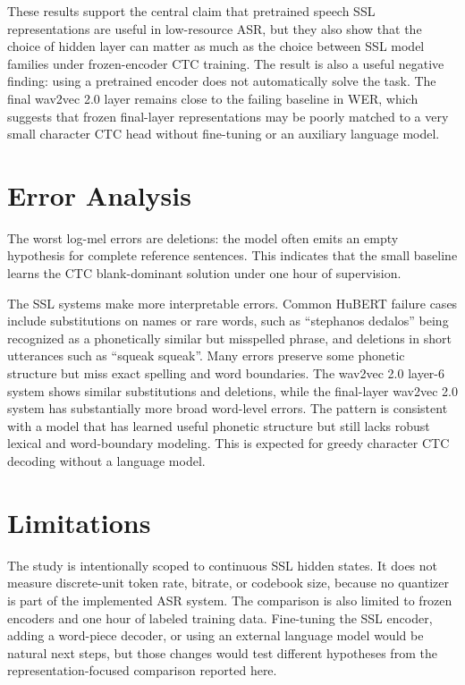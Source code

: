 \documentclass{article}
\begin{document}
These results support the central claim that pretrained speech SSL
representations are useful in low-resource ASR, but they also show that the
choice of hidden layer can matter as much as the choice between SSL model
families under frozen-encoder CTC training. The result is also a useful
negative finding: using a pretrained encoder does not automatically solve the
task. The final wav2vec 2.0 layer remains close to the failing baseline in WER,
which suggests that frozen final-layer representations may be poorly matched
to a very small character CTC head without fine-tuning or an auxiliary language
model.

\section{Error Analysis}

The worst log-mel errors are deletions: the model often emits an empty
hypothesis for complete reference sentences. This indicates that the small
baseline learns the CTC blank-dominant solution under one hour of supervision.

The SSL systems make more interpretable errors. Common HuBERT failure cases
include substitutions on names or rare words, such as ``stephanos dedalos''
being recognized as a phonetically similar but misspelled phrase, and
deletions in short utterances such as ``squeak squeak''. Many errors preserve
some phonetic structure but miss exact spelling and word boundaries. The
wav2vec 2.0 layer-6 system shows similar substitutions and deletions, while the
final-layer wav2vec 2.0 system has substantially more broad word-level errors.
The pattern is consistent with a model that has learned useful phonetic
structure but still lacks robust lexical and word-boundary modeling. This is
expected for greedy character CTC decoding without a language model.

\section{Limitations}

The study is intentionally scoped to continuous SSL hidden states. It does not
measure discrete-unit token rate, bitrate, or codebook size, because no
quantizer is part of the implemented ASR system. The comparison is also limited
to frozen encoders and one hour of labeled training data. Fine-tuning the SSL
encoder, adding a word-piece decoder, or using an external language model would
be natural next steps, but those changes would test different hypotheses from
the representation-focused comparison reported here.
\end{document}
